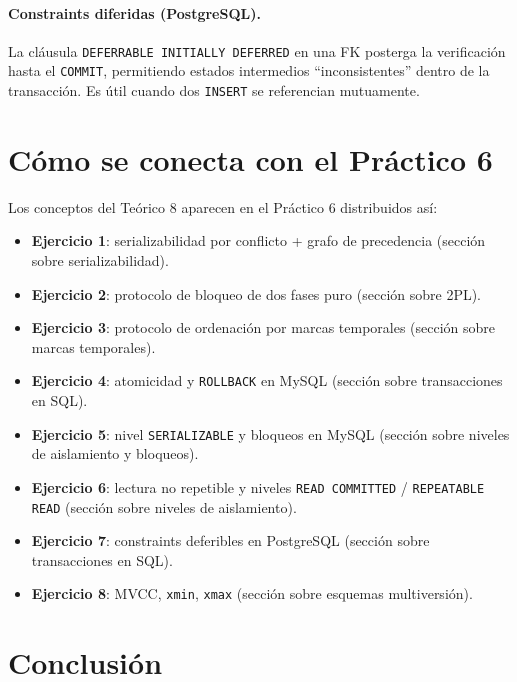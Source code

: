 \documentclass[11pt,a4paper]{article}
\begin{document}
\paragraph{Constraints diferidas (PostgreSQL).} La cláusula
\texttt{DEFERRABLE INITIALLY DEFERRED} en una FK posterga la verificación
hasta el \texttt{COMMIT}, permitiendo estados intermedios
``inconsistentes'' dentro de la transacción. Es útil cuando dos
\texttt{INSERT} se referencian mutuamente.

\section{Cómo se conecta con el Práctico 6}

Los conceptos del Teórico 8 aparecen en el Práctico 6 distribuidos así:

\begin{itemize}
    \item \textbf{Ejercicio 1}: serializabilidad por conflicto + grafo
    de precedencia (sección sobre serializabilidad).
    \item \textbf{Ejercicio 2}: protocolo de bloqueo de dos fases puro
    (sección sobre 2PL).
    \item \textbf{Ejercicio 3}: protocolo de ordenación por marcas
    temporales (sección sobre marcas temporales).
    \item \textbf{Ejercicio 4}: atomicidad y \texttt{ROLLBACK} en
    MySQL (sección sobre transacciones en SQL).
    \item \textbf{Ejercicio 5}: nivel \texttt{SERIALIZABLE} y bloqueos
    en MySQL (sección sobre niveles de aislamiento y bloqueos).
    \item \textbf{Ejercicio 6}: lectura no repetible y niveles
    \texttt{READ COMMITTED} / \texttt{REPEATABLE READ} (sección sobre
    niveles de aislamiento).
    \item \textbf{Ejercicio 7}: constraints deferibles en PostgreSQL
    (sección sobre transacciones en SQL).
    \item \textbf{Ejercicio 8}: MVCC, \texttt{xmin}, \texttt{xmax}
    (sección sobre esquemas multiversión).
\end{itemize}

\section{Conclusión}
\end{document}
